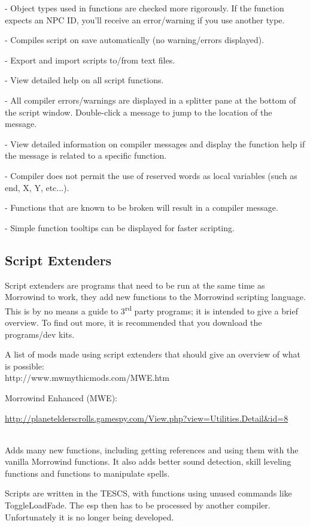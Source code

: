\documentclass[
]{article}
\begin{document}
- Object types used in functions are checked more rigorously. If the
function expects an NPC ID, you'll receive an error/warning if you use
another type.

- Compiles script on save automatically (no warning/errors displayed).

- Export and import scripts to/from text files.

- View detailed help on all script functions.

- All compiler errors/warnings are displayed in a splitter pane at the
bottom of the script window. Double-click a message to jump to the
location of the message.

- View detailed information on compiler messages and display the
function help if the message is related to a specific function.

- Compiler does not permit the use of reserved words as local variables
(such as end, X, Y, etc...).

- Functions that are known to be broken will result in a compiler
message.

- Simple function tooltips can be displayed for faster scripting.

\hypertarget{script-extenders}{%
\subsection{Script Extenders}\label{script-extenders}}

Script extenders are programs that need to be run at the same time as
Morrowind to work, they add new functions to the Morrowind scripting
language.\\
This is by no means a guide to 3\textsuperscript{rd} party programs; it
is intended to give a brief overview. To find out more, it is
recommended that you download the programs/dev kits.

A list of mods made using script extenders that should give an overview
of what is possible:\\
http://www.mwmythicmods.com/MWE.htm

Morrowind Enhanced (MWE):

\url{http://planetelderscrolls.gamespy.com/View.php?view=Utilities.Detail\&id=8}\strut \\
Adds many new functions, including getting references and using them
with the vanilla Morrowind functions. It also adds better sound
detection, skill leveling functions and functions to manipulate spells.

Scripts are written in the TESCS, with functions using unused commands
like ToggleLoadFade. The esp then has to be processed by another
compiler.\\
Unfortunately it is no longer being developed.
\end{document}
